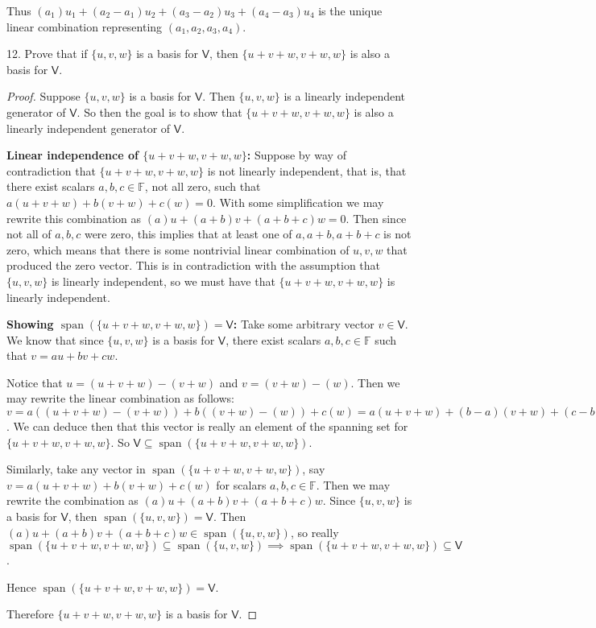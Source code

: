 \documentclass[11pt]{article}
\newcommand{\br}[1]{\left(#1\right)}
\newcommand{\cbr}[1]{\{#1\}}
\DeclareMathOperator{\Span}{span}
\begin{document}
Thus $\br{a_1}u_1 + \br{a_2 - a_1}u_2 + \br{a_3 - a_2}u_3 + \br{a_4 - a_3}u_4$ is the unique linear combination representing $(a_1,a_2,a_3,a_4)$.

12. Prove that if $\cbr{u,v,w}$ is a basis for $\mathsf{V}$, then $\cbr{u+v+w,v+w,w}$ is also a basis for $\mathsf{V}$.

\begin{proof}
    Suppose $\cbr{u,v,w}$ is a basis for $\mathsf{V}$. Then $\cbr{u,v,w}$ is a linearly independent generator of $\mathsf{V}$. So then the goal is to show that $\cbr{u+v+w,v+w,w}$ is also a linearly independent generator of $\mathsf{V}$.

    \textbf{Linear independence of $\cbr{u+v+w,v+w,w}$:} Suppose by way of contradiction that $\cbr{u+v+w,v+w,w}$ is not linearly independent, that is, that there exist scalars $a,b,c\in\mathbb{F}$, not all zero, such that $a\br{u+v+w} + b\br{v+w} + c\br{w} = 0$. With some simplification we may rewrite this combination as $\br{a}u + \br{a+b}v + \br{a+b+c}w = 0$. Then since not all of $a,b,c$ were zero, this implies that at least one of $a,a+b,a+b+c$ is not zero, which means that there is some nontrivial linear combination of $u,v,w$ that produced the zero vector. This is in contradiction with the assumption that $\cbr{u,v,w}$ is linearly independent, so we must have that $\cbr{u+v+w,v+w,w}$ is linearly independent.

    \textbf{Showing $\Span\br{\cbr{u+v+w,v+w,w}} = \mathsf{V}$:} Take some arbitrary vector $v\in\mathsf{V}$. We know that since $\cbr{u,v,w}$ is a basis for $\mathsf{V}$, there exist scalars $a,b,c\in\mathbb{F}$ such that $v = au+bv+cw$. 
    
    Notice that $u = \br{u+v+w} - \br{v+w}$ and $v = \br{v+w}-\br{w}$. Then we may rewrite the linear combination as follows: $v = a\br{\br{u+v+w} - \br{v+w}} + b\br{\br{v+w}-\br{w}} + c\br{w} = a\br{u+v+w} + \br{b-a}\br{v+w} + \br{c-b}\br{w}$. We can deduce then that this vector is really an element of the spanning set for $\cbr{u+v+w,v+w,w}$. So $\mathsf{V}\subseteq \Span\br{\cbr{u+v+w,v+w,w}}$.

    Similarly, take any vector in $\Span\br{\cbr{u+v+w,v+w,w}}$, say $v = a\br{u+v+w} + b\br{v+w} + c\br{w}$ for scalars $a,b,c\in\mathbb{F}$. Then we may rewrite the combination as $\br{a}u+\br{a+b}v+\br{a+b+c}w$. Since $\cbr{u,v,w}$ is a basis for $\mathsf{V}$, then $\Span\br{\cbr{u,v,w}} = \mathsf{V}$. Then $\br{a}u+\br{a+b}v+\br{a+b+c}w \in \Span\br{\cbr{u,v,w}}$, so really $\Span\br{\cbr{u+v+w,v+w,w}} \subseteq \Span\br{\cbr{u,v,w}} \implies \Span\br{\cbr{u+v+w,v+w,w}} \subseteq \mathsf{V}$.

    Hence $\Span\br{\cbr{u+v+w,v+w,w}} = \mathsf{V}$.

    Therefore $\cbr{u+v+w,v+w,w}$ is a basis for $\mathsf{V}$.
\end{proof}
\end{document}
